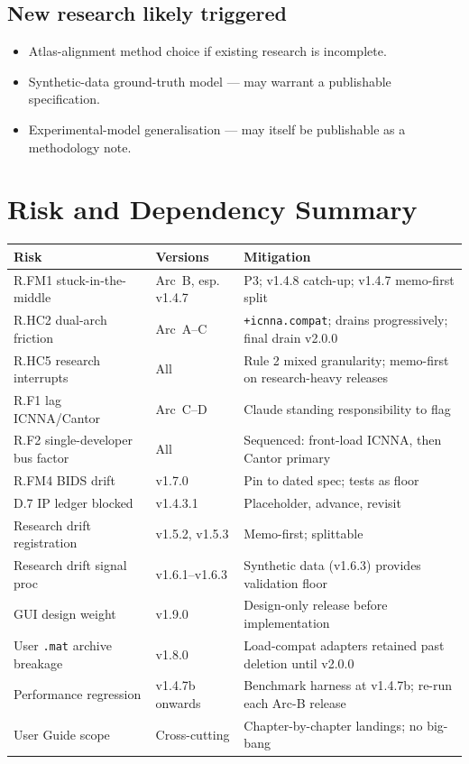 \documentclass[11pt,a4paper]{article}
\begin{document}
\subsection{New research likely triggered}

\begin{itemize}
    \item Atlas-alignment method choice if existing research is incomplete.
    \item Synthetic-data ground-truth model --- may warrant a publishable specification.
    \item Experimental-model generalisation --- may itself be publishable as a methodology note.
\end{itemize}

\section{Risk and Dependency Summary}

\begin{longtable}{p{3cm}p{4cm}p{7cm}}
\toprule
\textbf{Risk} & \textbf{Versions} & \textbf{Mitigation} \\
\midrule
\endhead
R.FM1 stuck-in-the-middle & Arc~B, esp. v1.4.7 & P3; v1.4.8 catch-up; v1.4.7 memo-first split \\
R.HC2 dual-arch friction & Arc~A--C & \texttt{+icnna.compat}; drains progressively; final drain v2.0.0 \\
R.HC5 research interrupts & All & Rule 2 mixed granularity; memo-first on research-heavy releases \\
R.F1 lag ICNNA/Cantor & Arc~C--D & Claude standing responsibility to flag \\
R.F2 single-developer bus factor & All & Sequenced: front-load ICNNA, then Cantor primary \\
R.FM4 BIDS drift & v1.7.0 & Pin to dated spec; tests as floor \\
D.7 IP ledger blocked & v1.4.3.1 & Placeholder, advance, revisit \\
Research drift registration & v1.5.2, v1.5.3 & Memo-first; splittable \\
Research drift signal proc & v1.6.1--v1.6.3 & Synthetic data (v1.6.3) provides validation floor \\
GUI design weight & v1.9.0 & Design-only release before implementation \\
User \texttt{.mat} archive breakage & v1.8.0 & Load-compat adapters retained past deletion until v2.0.0 \\
Performance regression & v1.4.7b onwards & Benchmark harness at v1.4.7b; re-run each Arc-B release \\
User Guide scope & Cross-cutting & Chapter-by-chapter landings; no big-bang \\
\bottomrule
\end{longtable}
\end{document}
